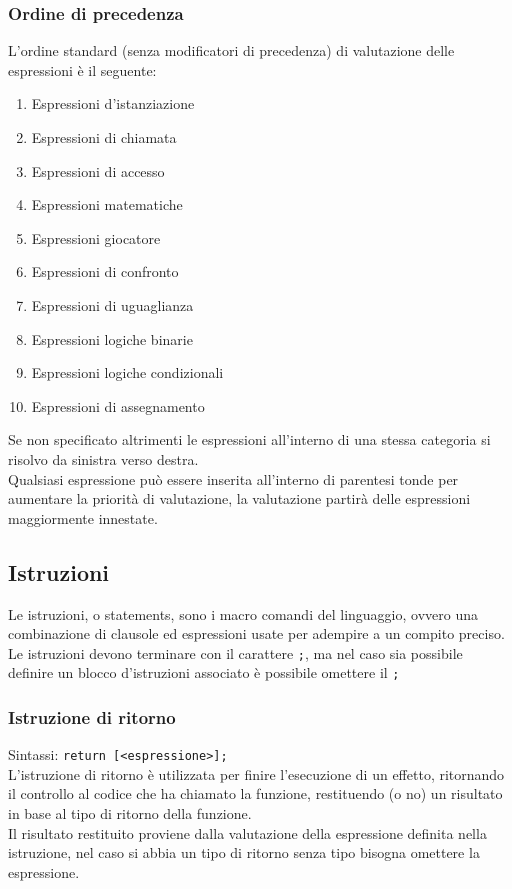 \subsubsection{Ordine di precedenza}
L'ordine standard (senza modificatori di precedenza) di valutazione delle espressioni è il seguente:
\begin{enumerate}
    \item Espressioni d'istanziazione
    \item Espressioni di chiamata
    \item Espressioni di accesso
    \item Espressioni matematiche
    \item Espressioni giocatore
    \item Espressioni di confronto
    \item Espressioni di uguaglianza 
    \item Espressioni logiche binarie 
    \item Espressioni logiche condizionali 
    \item Espressioni di assegnamento
\end{enumerate}
Se non specificato altrimenti le espressioni all'interno di una stessa categoria 
si risolvo da sinistra verso destra. \\
Qualsiasi espressione può essere inserita all'interno di parentesi tonde per aumentare 
la priorità di valutazione, la valutazione partirà delle espressioni maggiormente innestate.

\newpage
\subsection{Istruzioni}
Le istruzioni, o statements, sono i macro comandi del linguaggio, ovvero una combinazione 
di clausole ed espressioni usate per adempire a un compito preciso.
Le istruzioni devono terminare con il carattere \lstinline|;|, ma nel caso sia possibile definire
un blocco d'istruzioni associato è possibile omettere il \lstinline|;|

\subsubsection{Istruzione di ritorno}
Sintassi:   \lstinline|return [<espressione>];| \\
L’istruzione di ritorno è utilizzata per finire l’esecuzione di un effetto,
ritornando il controllo al codice che ha chiamato la funzione,
restituendo (o no) un risultato in base al tipo di ritorno della funzione. \\
Il risultato restituito proviene dalla valutazione della espressione definita nella istruzione,
nel caso si abbia un tipo di ritorno senza tipo bisogna omettere la espressione.

